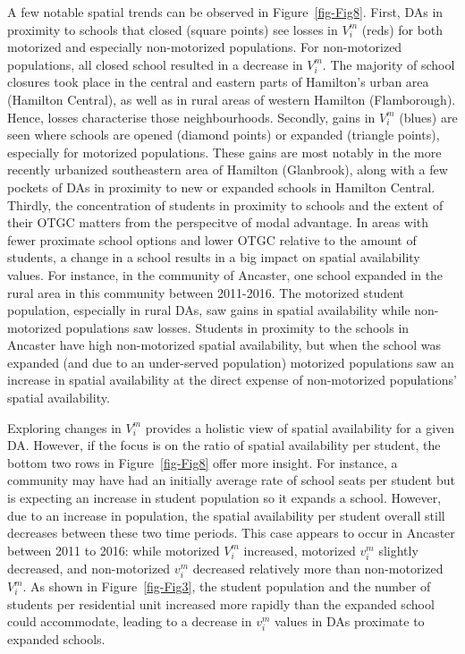 \documentclass[
default
]{sn-jnl}
\begin{document}
A few notable spatial trends can be observed in Figure~\ref{fig-Fig8}.
First, DAs in proximity to schools that closed (square points) see
losses in \(V_i^m\) (reds) for both motorized and especially
non-motorized populations. For non-motorized populations, all closed
school resulted in a decrease in \(V_i^m\). The majority of school
closures took place in the central and eastern parts of Hamilton's urban
area (Hamilton Central), as well as in rural areas of western Hamilton
(Flamborough). Hence, losses characterise those neighbourhoods.
Secondly, gains in \(V_i^m\) (blues) are seen where schools are opened
(diamond points) or expanded (triangle points), especially for motorized
populations. These gains are most notably in the more recently urbanized
southeastern area of Hamilton (Glanbrook), along with a few pockets of
DAs in proximity to new or expanded schools in Hamilton Central.
Thirdly, the concentration of students in proximity to schools and the
extent of their OTGC matters from the perspecitve of modal advantage. In
areas with fewer proximate school options and lower OTGC relative to the
amount of students, a change in a school results in a big impact on
spatial availability values. For instance, in the community of Ancaster,
one school expanded in the rural area in this community between
2011-2016. The motorized student population, especially in rural DAs,
saw gains in spatial availability while non-motorized populations saw
losses. Students in proximity to the schools in Ancaster have high
non-motorized spatial availability, but when the school was expanded
(and due to an under-served population) motorized populations saw an
increase in spatial availability at the direct expense of non-motorized
populations' spatial availability.

Exploring changes in \(V_i^m\) provides a holistic view of spatial
availability for a given DA. However, if the focus is on the ratio of
spatial availability per student, the bottom two rows in
Figure~\ref{fig-Fig8} offer more insight. For instance, a community may
have had an initially average rate of school seats per student but is
expecting an increase in student population so it expands a school.
However, due to an increase in population, the spatial availability per
student overall still decreases between these two time periods. This
case appears to occur in Ancaster between 2011 to 2016: while motorized
\(V_i^m\) increased, motorized \(v_i^m\) slightly decreased, and
non-motorized \(v_i^m\) decreased relatively more than non-motorized
\(V_i^m\). As shown in Figure~\ref{fig-Fig3}, the student population and
the number of students per residential unit increased more rapidly than
the expanded school could accommodate, leading to a decrease in
\(v_i^m\) values in DAs proximate to expanded schools.
\end{document}
